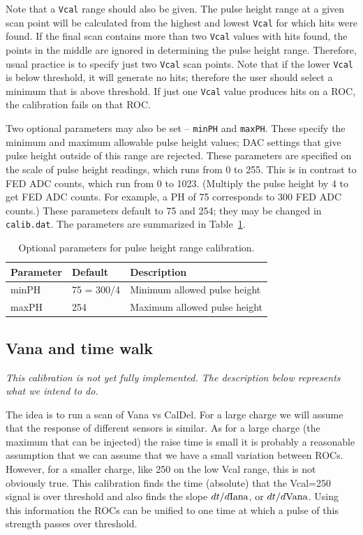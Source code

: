 Note that a \verb|Vcal| range should also be given.  The pulse height range at a given scan point will be calculated from the highest and lowest \verb|Vcal| for which hits were found.  If the final scan contains more than two \verb|Vcal| values with hits found, the points in the middle are ignored in determining the pulse height range.  Therefore, usual practice is to specify just two \verb|Vcal| scan points.  Note that if the lower \verb|Vcal| is below threshold, it will generate no hits; therefore the user should select a minimum that is above threshold.  If just one \verb|Vcal| value produces hits on a ROC, the calibration fails on that ROC.

Two optional parameters may also be set -- \verb|minPH| and \verb|maxPH|.  These specify the minimum and maximum allowable pulse height values; DAC settings that give pulse height outside of this range are rejected.  These parameters are specified on the scale of pulse height readings, which runs from 0 to 255.  This is in contrast to FED ADC counts, which run from 0 to 1023.  (Multiply the pulse height by 4 to get FED ADC counts.  For example, a PH of 75 corresponds to 300 FED ADC counts.)  These parameters default to 75 and 254; they may be changed in \verb|calib.dat|.  The parameters are summarized in Table~\ref{tab:PHRangeParameters}.

\begin{table}
\centering
\caption{Optional parameters for pulse height range calibration.}
\label{tab:PHRangeParameters}
\begin{tabular}{l@{~~~~}l@{~~~~}l}
\hline
\hline
Parameter & Default & Description \\
\hline
minPH                   &  75 = 300/4 & Minimum allowed pulse height \\
maxPH                   & 254         & Maximum allowed pulse height \\
\hline
\hline
\end{tabular}
\end{table}

\subsection{Vana and time walk}

{\it This calibration is not yet fully implemented. The description below represents what we intend to do.}

The idea is to run a scan of Vana vs CalDel. For a large charge we will assume that the response of different sensors is similar. As for a large charge (the maximum that can be injected) the raise time is small it is probably a reasonable assumption that we can assume that we have a small variation between ROCs. However, for a  smaller charge, like 250 on the low Vcal range, this is not obviously true. This calibration finds the time (absolute) that the Vcal=250 signal is over threshold and also finds the slope $dt/d{\rm Iana}$, or $dt/d{\rm Vana}$. Using this information the ROCs can be unified to one time at which a pulse of this strength passes over threshold.

